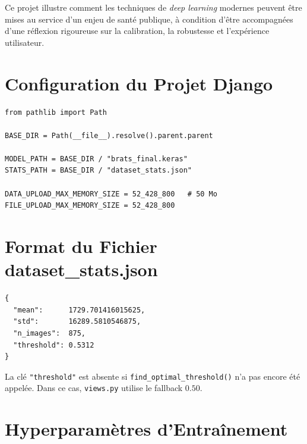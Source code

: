 \documentclass[12pt, a4paper]{report}
\newcommand{\code}[1]{\texttt{\small #1}}
\newcommand{\fichier}[1]{\texttt{\small\color{blue!70!black}#1}}
\begin{document}
\begin{successbox}
  Ce projet illustre comment les techniques de \textit{deep learning}
  modernes peuvent être mises au service d'un enjeu de santé publique,
  à condition d'être accompagnées d'une réflexion rigoureuse sur la
  calibration, la robustesse et l'expérience utilisateur.
\end{successbox}

\printbibliography[heading=bibintoc, title={Références Bibliographiques}]

\appendix

\chapter{Configuration du Projet Django}
\label{ann:settings}

\begin{lstlisting}[caption={Extraits de settings.py},
                   label={lst:settings}]
from pathlib import Path

BASE_DIR = Path(__file__).resolve().parent.parent

MODEL_PATH = BASE_DIR / "brats_final.keras"
STATS_PATH = BASE_DIR / "dataset_stats.json"

DATA_UPLOAD_MAX_MEMORY_SIZE = 52_428_800   # 50 Mo
FILE_UPLOAD_MAX_MEMORY_SIZE = 52_428_800
\end{lstlisting}

\chapter{Format du Fichier dataset\_stats.json}
\label{ann:json}

\begin{lstlisting}[caption={dataset\_stats.json complet après entraînement},
                   label={lst:json_full}]
{
  "mean":      1729.701416015625,
  "std":       16289.5810546875,
  "n_images":  875,
  "threshold": 0.5312
}
\end{lstlisting}

La clé \code{"threshold"} est absente si \code{find\_optimal\_threshold()}
n'a pas encore été appelée. Dans ce cas, \fichier{views.py} utilise
le fallback \(0.50\).

\chapter{Hyperparamètres d'Entraînement}
\label{ann:hyperparams}
\end{document}
